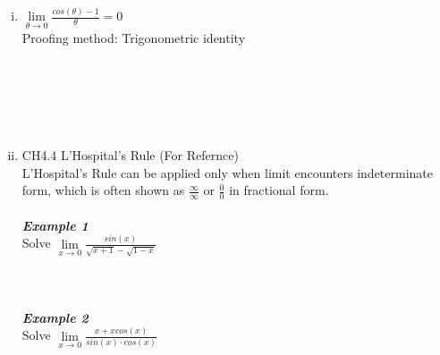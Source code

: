 \documentclass[12px]{article}
\begin{document}
\begin{enumerate}
\begin{enumerate}[i.]
            \\
            \\
            \item $\lim\limits_{\theta\to0}\frac{cos(\theta)-1}{\theta}=0$\\
            Proofing method: Trigonometric identity\\
            \\
            \\
            \\
            \\
            \\
            \item CH4.4 L'Hospital's Rule (For Refernce)\\
            L'Hospital's Rule can be applied only when limit encounters indeterminate form, which is often shown as $\frac{\infty}{\infty}$ or $\frac{0}{0}$ in fractional form.\\
            \\
            \textbf{\textit{Example 1}}\\
            Solve $\lim\limits_{x\to0}\frac{sin(x)}{\sqrt{x+1}-\sqrt{1-x}}$\\
            \\
            \\
            \\
            
            \textbf{\textit{Example 2}}\\
            Solve $\lim\limits_{x\to0}\frac{x+xcos(x)}{sin(x)\cdot cos(x)}$\\
            \\
            \\
            \\
            

\end{enumerate}
\end{enumerate}
\end{document}
